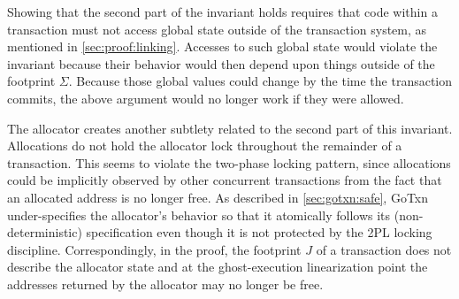 Showing that the second part of the invariant holds requires that code within a
transaction must not access global state outside of the
transaction system, as mentioned in \cref{sec:proof:linking}. Accesses to such global state
would violate the invariant because their behavior would then depend upon
things outside of the footprint $\Sigma$. Because those global values could change
by the time the transaction commits, the above argument would no longer work if they were allowed.

The allocator creates another subtlety related to the second part of this
invariant. Allocations do not hold the allocator lock throughout the remainder
of a transaction. This seems to violate the two-phase locking pattern, since
allocations could be implicitly observed by other concurrent transactions from
the fact that an allocated address is no longer free. As described in
\cref{sec:gotxn:safe}, GoTxn under-specifies the allocator's behavior so that it
atomically follows its (non-deterministic) specification even though it is not
protected by the 2PL locking discipline. Correspondingly, in the
proof, the footprint $J$ of a transaction does not describe the allocator state
and at the ghost-execution linearization point the addresses returned by the
allocator may no longer be free.



